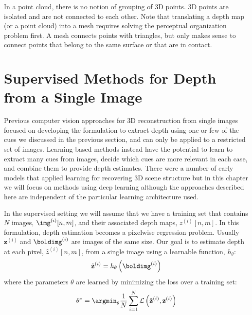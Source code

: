 In a point cloud, there is no notion of grouping of 3D points. 3D points are isolated and are not connected to each other. Note that translating a depth map (or a point cloud) into a mesh requires solving the perceptual organization problem first. A mesh connects points with triangles, but only makes sense to connect points that belong to the same surface or that are in contact.



\section{Supervised Methods for Depth from a Single Image}

Previous computer vision approaches for 3D reconstruction from single images focused on developing the formulation to extract depth using one or few of the cues we discussed in the previous section, and can only be applied to a restricted set of images. Learning-based methods instead have the potential to learn to extract many cues from images, decide which cues are more relevant in each case, and combine them to provide depth estimates. There were a number of early models that applied learning for recovering 3D scene structure \cite{Saxena2008,Derek2005} but in this chapter we will focus on methods using deep learning although the approaches described here are independent of the particular learning architecture used.


In the supervised setting we will assume that we have a training set that contains $N$ images, $\img^{(i)} [n,m]$, and their associated depth maps, $z^{(i)} [n,m]$. In this formulation, depth estimation becomes a pixelwise regression problem. Usually $\mathbf{z}^{(i)}$ and $\boldimg^{(i)}$ are images of the same size.
Our goal is to estimate depth at each pixel, $\hat{z}^{(i)}[n,m]$, from a single image using a learnable function, $h_\theta$:
\begin{equation}
    \hat{\mathbf{z}}^{(i)} = h_\theta \left( \boldimg^{(i)} \right)
\end{equation}
where the parameters $\theta$ are learned by minimizing the loss over a training set:
\begin{equation}
    \theta^* = \argmin_{\theta} \frac{1}{N}\sum_{i=1}^N \mathcal{L} \left( \hat{\mathbf{z}}^{(i)}, \mathbf{z}^{(i)} \right)
\end{equation}




